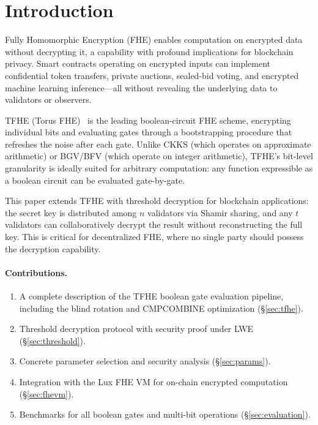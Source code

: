 \section{Introduction}

\label{sec:introduction}

Fully Homomorphic Encryption (FHE) enables computation on encrypted data without
decrypting it, a capability with profound implications for blockchain privacy.
Smart contracts operating on encrypted inputs can implement confidential token transfers,
private auctions, sealed-bid voting, and encrypted machine learning inference---all
without revealing the underlying data to validators or observers.

TFHE (Torus FHE)~\cite{chillotti2020tfhe} is the leading boolean-circuit FHE scheme,
encrypting individual bits and evaluating gates through a bootstrapping procedure that
refreshes the noise after each gate. Unlike CKKS (which operates on approximate
arithmetic) or BGV/BFV (which operate on integer arithmetic), TFHE's bit-level
granularity is ideally suited for arbitrary computation: any function expressible as a
boolean circuit can be evaluated gate-by-gate.

This paper extends TFHE with threshold decryption for blockchain applications: the secret
key is distributed among $n$ validators via Shamir sharing, and any $t$ validators can
collaboratively decrypt the result without reconstructing the full key. This is critical
for decentralized FHE, where no single party should possess the decryption capability.

\paragraph{Contributions.}
\begin{enumerate}[nosep]
\item A complete description of the TFHE boolean gate evaluation pipeline, including
the blind rotation and CMPCOMBINE optimization (\S\ref{sec:tfhe}).
\item Threshold decryption protocol with security proof under LWE (\S\ref{sec:threshold}).
\item Concrete parameter selection and security analysis (\S\ref{sec:params}).
\item Integration with the Lux FHE VM for on-chain encrypted computation (\S\ref{sec:fhevm}).
\item Benchmarks for all boolean gates and multi-bit operations (\S\ref{sec:evaluation}).
\end{enumerate}

